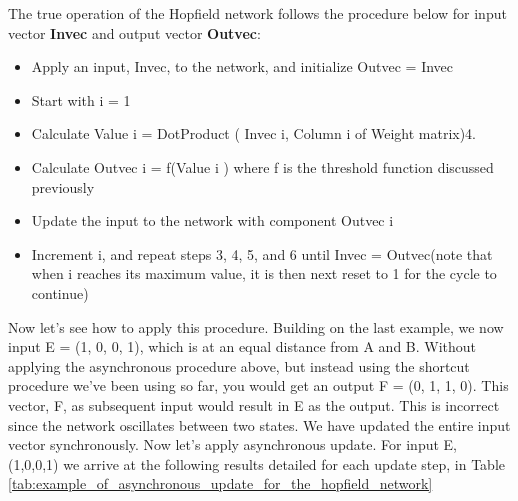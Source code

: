 The true operation of the Hopfield network follows the procedure below for input vector \textbf{Invec} and output vector \textbf{Outvec}:

\begin {itemize}
\item Apply an input, Invec, to the network, and initialize Outvec = Invec
\item Start with i = 1
\item Calculate Value i = DotProduct ( Invec i, Column i of Weight matrix)4. 
\item Calculate Outvec i = f(Value i ) where f is the threshold function discussed previously
\item Update the input to the network with component Outvec i
\item Increment i, and repeat steps 3, 4, 5, and 6 until Invec = Outvec(note that when i reaches its maximum value, it is then next reset to 1 for the cycle to continue)
\end{itemize}

Now let’s see how to apply this procedure. Building on the last example, we
now input E = (1, 0, 0, 1), which is at an equal distance from A and B. Without
applying the asynchronous procedure above, but instead using the shortcut
procedure we’ve been using so far, you would get an output F = (0, 1, 1, 0).
This vector, F, as subsequent input would result in E as the output. This is
incorrect since the network oscillates between two states. We have updated the
entire input vector synchronously.
Now let’s apply asynchronous update. For input E, (1,0,0,1) we arrive at the
following results detailed for each update step, in Table \ref{tab:example_of_asynchronous_update_for_the_hopfield_network}

